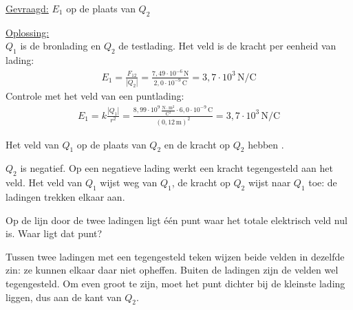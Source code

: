 \documentclass{ximera}
\begin{document}
\begin{exercise}
\begin{question}
\begin{solution}
            \underline{Gevraagd:} $E_1$ op de plaats van $Q_2$

            \underline{Oplossing:}\\
            $Q_1$ is de bronlading en $Q_2$ de testlading. Het veld is de kracht per eenheid van lading:
            \begin{align*}
                E_1 = \frac{F_{12}}{|Q_2|} = \frac{7{,}49 \cdot 10^{-6} \, \mathrm{N}}{2{,}0 \cdot 10^{-9} \, \mathrm{C}} = \boxed{3{,}7 \cdot 10^{3} \, \mathrm{N/C}}
            \end{align*}
            Controle met het veld van een puntlading:
            \begin{align*}
                E_1 = k \frac{|Q_1|}{r^2} = \frac{8{,}99 \cdot 10^{9} \, \mathrm{\frac{N \cdot m^2}{C^2}} \cdot 6{,}0 \cdot 10^{-9} \, \mathrm{C}}{(0{,}12 \, \mathrm{m})^2} = 3{,}7 \cdot 10^{3} \, \mathrm{N/C}
            \end{align*}
        \end{solution}
    \end{question}

    \begin{question}
        Het veld van $Q_1$ op de plaats van $Q_2$ en de kracht op $Q_2$ hebben
        .

        \begin{solution}\nl
            $Q_2$ is negatief. Op een negatieve lading werkt een kracht tegengesteld aan het veld. Het veld van $Q_1$ wijst weg van $Q_1$, de kracht op $Q_2$ wijst naar $Q_1$ toe: de ladingen trekken elkaar aan.
        \end{solution}
    \end{question}

    \begin{question}
        Op de lijn door de twee ladingen ligt één punt waar het totale elektrisch veld nul is. Waar ligt dat punt?

        \begin{multipleChoice}
        \end{multipleChoice}

        \begin{solution}\nl
            Tussen twee ladingen met een tegengesteld teken wijzen beide velden in dezelfde zin: ze kunnen elkaar daar niet opheffen. Buiten de ladingen zijn de velden wel tegengesteld. Om even groot te zijn, moet het punt dichter bij de kleinste lading liggen, dus aan de kant van $Q_2$.
        \end{solution}
    \end{question}


\end{exercise}
\end{document}
